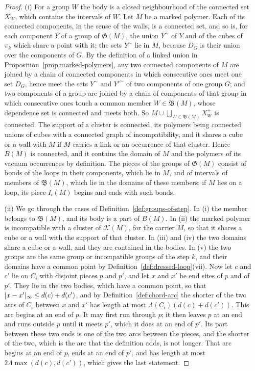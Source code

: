 \documentclass[11pt]{preprint}
\DeclarePairedDelimiter{\abs}{\lvert}{\rvert}
\numberwithin{equation}{section}
\theoremstyle{definition}
\theoremstyle{remark}
\theoremstyle{plain}
\begin{document}
\begin{proof}
(i) For a group $W$ the body is a closed neighbourhood of the connected set $X_W$, which contains the intervals of $W$. Let $M$ be a marked polymer. Each of its connected components, in the sense of the walls, is a connected set, and so is, for each component $Y$ of a group of $\mathfrak G(M)$, the union $Y^\sim$ of $Y$ and of the cubes of $\pi_k$ which share a point with it; the sets $Y^\sim$ lie in $M$, because $D_G$ is their union over the components of $G$. By the definition of a linked union in Proposition~\ref{prop:marked-polymers}, any two connected components of $M$ are joined by a chain of connected components in which consecutive ones meet one set $D_G$, hence meet the sets $Y^\sim$ and $Y'^\sim$ of two components of one group $G$; and two components of a group are joined by a chain of components of that group in which consecutive ones touch a common member $W \in \mathfrak B(M)$, whose dependence set is connected and meets both. So $M \cup \bigcup_{W \in \mathfrak B(M)}X^+_W$ is connected. The support of a cluster is connected, its polymers being connected unions of cubes with a connected graph of incompatibility, and it shares a cube or a wall with $M$ if $M$ carries a link or an occurrence of that cluster. Hence $B(M)$ is connected, and it contains the domain of $M$ and the polymers of its vacuum occurrences by definition. The pieces of the groups of $\mathfrak G(M)$ consist of bonds of the loops in their components, which lie in $M$, and of intervals of members of $\mathfrak B(M)$, which lie in the domains of these members; if $M$ lies on a loop, its piece $I_i(M)$ begins and ends with such bonds.

(ii) We go through the cases of Definition~\ref{def:groups-of-step}. In (i) the member belongs to $\mathfrak B(M)$, and its body is a part of $B(M)$. In (ii) the marked polymer is incompatible with a cluster of $\mathcal K(M)$, for the carrier $M$, so that it shares a cube or a wall with the support of that cluster. In (iii) and (iv) the two domains share a cube or a wall, and they are contained in the bodies. In (v) the two groups are the same group or incompatible groups of the step $k$, and their domains have a common point by Definition~\ref{def:dressed-loop}(vii). Now let $c$ and $c'$ lie on $C_i$ with disjoint pieces $p$ and $p'$, and let $x$ and $x'$ be end sites of $p$ and of $p'$. They lie in the two bodies, which have a common point, so that $\abs{x - x'}_\infty \leq d(c) + d(c')$, and by Definition~\ref{def:chord-arc} the shorter of the two arcs of $C_i$ between $x$ and $x'$ has length at most $\Lambda(C_i)(d(c) + d(c'))$. This arc begins at an end of $p$. It may first run through $p$; it then leaves $p$ at an end and runs outside $p$ until it meets $p'$, which it does at an end of $p'$. Its part between these two ends is one of the two arcs between the pieces, and the shorter of the two, which is the arc that the definition adds, is not longer. That arc begins at an end of $p$, ends at an end of $p'$, and has length at most $2\bar\Lambda\max(d(c), d(c'))$, which gives the last statement.


\end{proof}
\end{document}
